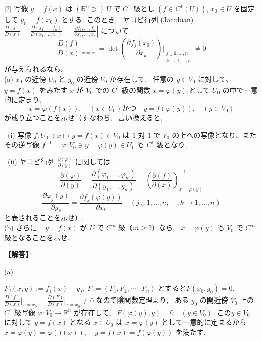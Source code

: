 \documentclass{jsarticle}
\begin{document}
\begin{itembox}[l]{[2]}
写像 $y = f(x)$ は $(\mathbb{R}^n \supset) \ U$ で $C^1$ 級とし $(f \in C^1(U))$, $x_0 \in U$ を固定して $y_0 = f(x_0)$ とする. このとき, \ ヤコビ行列 (Jacobian) $\frac{D(f)}{D(x)} = \frac{D(f_1, ..., f_n)}{D(x_1, ..., x_n)} = \left| \frac{\partial f_1, ..., f_n}{\partial x_1, ..., x_n}\right|$ について
\[
\displaystyle \frac{D(f)}{D(x)} \bigg|_{x=x_0} = 
\det \left( \frac{\partial f_j(x_0)}{\partial x_k} \right) \bigg|_{\substack{j\downarrow 1, ..., n \\ k \to 1, ..., n}} \neq 0
\]
が与えられるなら, \\
(a) $x_0$ の近傍 $U_0$ と $y_0$ の近傍 $V_0$ が存在して, \ 任意の $y \in V_0$ に対して、$y = f(x)$ をみたす $x$ が $V_0$ での $C^1$ 級の関数 $x = \varphi(y)$ として $U_0$ の中で一意的に定まり, \ 
\[
x = \varphi(f(x)), \quad (x \in U_0)　かつ \quad y = f(\varphi(y)), \quad (y \in V_0)
\]
が成り立つことを示せ（すなわち, \ 言い換えると, \ 

 \ (i) 写像 $f : U_0 \ni x \mapsto y = f(x) \in V_0$ は $1$ 対 $1$ で $V_0$ の上への写像となり、またその逆写像 $f^{-1} = \varphi : V_0 \ni y = \varphi(y) \in U_0$ も $C^1$ 級となり,

 \ (ii) ヤコビ行列 $\frac{\partial (\varphi)}{\partial (y)}$ に関しては
\[
\frac{\partial (\varphi)}{\partial (y)} =
\frac{\partial (\varphi_1, \dots, \varphi_n)}{\partial (y_1, \dots, y_n)}
= \left( \frac{\partial (f)}{\partial (x)} \right)^{-1}_{x = \varphi(y)}
\]
\[
\frac{\partial \varphi_j(y)}{\partial y_k} = \frac{\partial f_j(\varphi(y))}{\partial x_k}
\quad (j \downarrow 1, \dots, n; \quad , k \to 1, \dots, n)
\]
と表されることを示せ）. \\
(b) さらに, \ $y = f(x)$ が $U$ で $C^m$ 級（$m \geq 2$）なら, \ $x = \varphi(y)$ も $V_0$ で $C^m$ 級となることを示せ.  
\end{itembox}

\noindent
\textbf{【解答】}

\noindent
(a)

$F_j (x, y) := f_j (x) - y_j, \ F := (F_1, F_2, \cdots\cdots F_n)$ とすると$F(x_0, y_0) = 0$. $\displaystyle \frac{D(f)}{D(x)} \bigg|_{x=x_0} = 
\displaystyle \frac{D(F)}{D(x)} \bigg|_{x=x_0} \neq 0$ なので陰関数定理より, \ ある $y_0$ の開近傍 $V_0$ 上の$C^r$ 級写像 $\varphi : V_0 \to \mathbb{R}^n$ が存在して, \ $F(\varphi(y), y) = 0 \quad (y \in V_0)$.
この$y \in V_0$ に対して $y = f(x)$ となる $x \in U_0$ は $x = \varphi(y)$ として一意的に定まるから 
$x = \varphi(y) = \varphi(f(x)), \quad y = f(x) = f(\varphi(y))$ を満たす.
\end{document}
